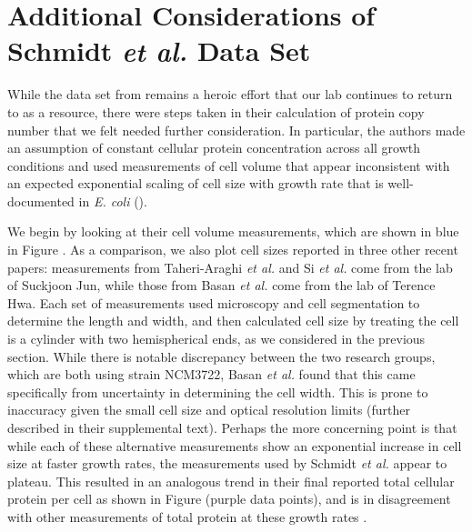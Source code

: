 \section{Additional Considerations of Schmidt \textit{et al.} Data Set}
\label{sec:SI_schmidt}

While the data set from \cite{schmidt2016} remains a heroic effort that our
lab continues to return to as a resource, there were steps taken in their
calculation of protein copy number that we felt needed further
consideration. In particular, the authors made an assumption of constant
cellular protein concentration across all growth conditions and used
measurements of cell volume that appear inconsistent with an expected
exponential scaling of cell size with growth rate that is well-documented in
\textit{E. coli} (\cite{schaechter1958, taheriaraghi2015, si2017}).

We begin by looking at their cell volume measurements, which are shown in blue
in Figure . As a comparison, we also plot cell sizes
reported in three other recent papers: measurements from Taheri-Araghi
\textit{et al.} and Si \textit{et al.} come from the lab of Suckjoon Jun, while
those from Basan \textit{et al.} come  from the lab of Terence Hwa.  Each set of
measurements used microscopy and cell segmentation to determine the length and
width, and then calculated cell size by treating the cell is a cylinder with two
hemispherical ends, as we considered in the previous section. While there is
notable discrepancy between the two research groups, which are both using strain
NCM3722, Basan \textit{et al.} found that this came specifically from
uncertainty in determining the cell width. This is prone to inaccuracy given the
small cell size and optical resolution limits (further described in their
supplemental text). Perhaps the more concerning point is that while each of
these alternative measurements show an exponential increase in  cell size at
faster growth rates, the measurements used by Schmidt \textit{et al.} appear to
plateau. This resulted in an analogous trend in their final reported total
cellular protein per cell as shown in Figure 
(purple data points), and is in disagreement with other measurements of total
protein at these growth rates \citep{basan2015}.

